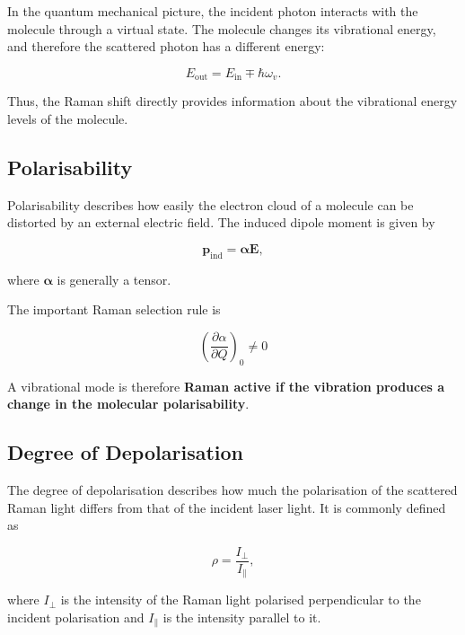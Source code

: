 \documentclass[11pt,a4paper]{article}
\begin{document}
In the quantum mechanical picture, the incident photon interacts with the molecule
through a virtual state. The molecule changes its vibrational energy, and therefore
the scattered photon has a different energy:

\begin{equation}
    E_{\mathrm{out}}
    =
    E_{\mathrm{in}} \mp \hbar\omega_v.
\end{equation}

Thus, the Raman shift directly provides information about the vibrational energy
levels of the molecule.


\subsection{Polarisability}

Polarisability describes how easily the electron cloud of a molecule can be
distorted by an external electric field. The induced dipole moment is given by

\begin{equation}
    \mathbf{p}_{\mathrm{ind}}
    =
    \boldsymbol{\alpha}\mathbf{E},
\end{equation}

where $\boldsymbol{\alpha}$ is generally a tensor.

The important Raman selection rule is

\begin{equation}
    \boxed{
    \left(\frac{\partial\alpha}{\partial Q}\right)_0 \neq 0
    }
\end{equation}

A vibrational mode is therefore \textbf{Raman active if the vibration produces
a change in the molecular polarisability}.


\subsection{Degree of Depolarisation}
\label{sec:depol}
The degree of depolarisation describes how much the polarisation of the scattered
Raman light differs from that of the incident laser light. It is commonly defined as

\begin{equation}
    \rho
    =
    \frac{I_{\perp}}{I_{\parallel}},
\end{equation}

where $I_{\perp}$ is the intensity of the Raman light polarised perpendicular to
the incident polarisation and $I_{\parallel}$ is the intensity parallel to it.
\end{document}
